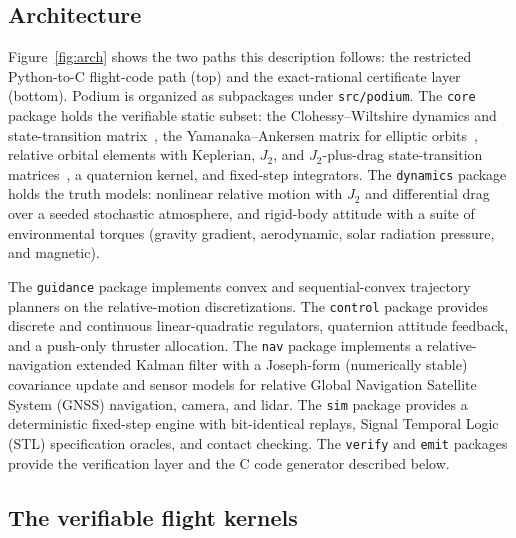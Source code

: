 \documentclass[11pt]{article}
\begin{document}
\subsection{Architecture}

Figure~\ref{fig:arch} shows the two paths this description follows: the restricted
Python-to-C flight-code path (top) and the exact-rational certificate layer
(bottom). Podium is organized as subpackages under \texttt{src/podium}. The
\texttt{core}
package holds the verifiable static subset: the Clohessy--Wiltshire dynamics and
state-transition matrix~\cite{clohessy1960}, the Yamanaka--Ankersen matrix for
elliptic orbits~\cite{yamanaka2002}, relative orbital elements with Keplerian, $J_2$, and
$J_2$-plus-drag state-transition matrices~\cite{koenig2017}, a quaternion kernel,
and fixed-step integrators. The \texttt{dynamics} package holds the truth models:
nonlinear relative motion with $J_2$ and differential drag over a seeded
stochastic atmosphere, and rigid-body attitude with a suite of environmental
torques (gravity gradient, aerodynamic, solar radiation pressure, and magnetic).

The \texttt{guidance} package implements convex and sequential-convex trajectory
planners on the relative-motion discretizations. The \texttt{control} package
provides discrete and continuous linear-quadratic regulators, quaternion attitude
feedback, and a push-only thruster allocation. The \texttt{nav} package
implements a relative-navigation extended Kalman filter with a Joseph-form
(numerically stable) covariance update and sensor models for relative Global
Navigation Satellite System (GNSS) navigation, camera, and lidar. The \texttt{sim} package provides a deterministic
fixed-step engine with bit-identical replays, Signal Temporal Logic (STL)
specification oracles, and contact checking. The \texttt{verify} and \texttt{emit}
packages provide the verification layer and the C code generator described below.

\subsection{The verifiable flight kernels}
\end{document}

